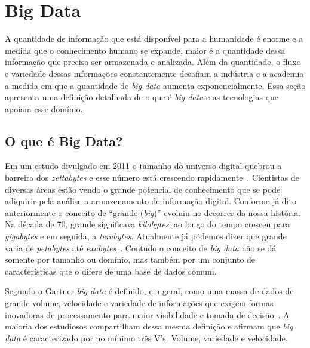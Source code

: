 \section{Big Data}


A quantidade de informação que está disponível para a humanidade é enorme e a medida que o conhecimento humano se expande, maior é a quantidade dessa informação que precisa ser armazenada e analizada. Além da quantidade, o fluxo e variedade dessas informações constantemente desafiam a indústria e a academia a medida em que a quantidade de \textit{big  data} aumenta exponencialmente. Essa seção apresenta uma definição detalhada de o que é \textit{big data} e as tecnologias que apoiam esse domínio.

\subsection{O que é Big Data?}

Em um estudo divulgado em 2011 o tamanho do universo digital quebrou a barreira dos \textit{zettabytes} e esse número está crescendo rapidamente~\cite{emcuniversedigital}. Cientistas de diversas áreas estão vendo o grande potencial de conhecimento que se pode adiquirir pela análise a armazenamento de informação digital. Conforme já dito anteriormente o conceito de ``grande (\textit{big})''  evoluiu no decorrer da nossa história. Na década de 70, grande significava \emph{kilobytes}; ao longo do tempo cresceu para \emph{gigabytes} e em seguida, a \emph{terabytes}. Atualmente já podemos dizer que grande varia de \emph{petabytes}  até \emph{exabytes}~\cite{WNextBigData}. Contudo  o  conceito de \textit{big data} não se dá somente por tamanho ou domínio, mas também por um conjunto de características que o difere de uma base de dados comum.

Segundo o Gartner \emph{big data} é definido, em geral, como uma massa de dados de grande volume, velocidade e variedade de informações que exigem formas inovadoras de processamento para maior visibilidade e tomada de decisão~\cite{conceitoGartner}. A maioria dos estudiosos compartilham dessa mesma definição e afirmam que \textit{big data} é caracterizado por no mínimo três V's. Volume, variedade e  velocidade.~\cite{ibmbigdatavvv,fromdbtobigdata}

